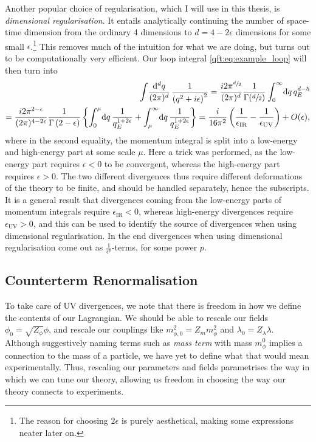 \documentclass[../main.tex]{subfiles}
\begin{document}
Another popular choice of regularisation, which I will use in this thesis, is
\emph{dimensional regularisation}. It entails analytically continuing the
number of space-time dimension from the ordinary 4 dimensions to \(d
= 4-2\epsilon\) dimensions for some small \(\epsilon\).\footnote{The reason for choosing \(2\epsilon\) is purely aesthetical, making some expressions neater later on.} This removes much of
the intuition for what we are doing, but turns out to be computationally very
efficient. Our loop integral \cref{qft:eq:example_loop} will then turn into
\begin{align}
  \nonumber
  \loopintegral[d]{q} \frac{1}{\pclosed{q^2+i\epsilon}^2} = \frac{i
    2\pi^{\sfrac{d}{2}}}{(2\pi)^d} \frac{1}{\Gamma(\sfrac{d}{2})}
  \integral[_0^\infty]{q} q_E^{d-5} \\
  = \frac{i 2\pi^{2-\epsilon}}{(2\pi)^{4-2\epsilon}}
  \frac{1}{\Gamma\pclosed{2-\epsilon}} \cclosed{ \integral[_0^\mu]{q}
  \frac{1}{q_E^{1+2\epsilon}} + \integral[_\mu^\infty]{q}
  \frac{1}{q_E^{1+2\epsilon}} } = \frac{i}{16\pi^2}
  \pclosed{\frac{1}{\epsilon_\text{IR}} - \frac{1}{\epsilon_\text{UV}}} +
  O(\epsilon),
\end{align}
where in the second equality, the momentum integral is split into a low-energy and high-energy part at some scale \(\mu\).
Here a trick was performed, as the low-energy part requires \(\epsilon < 0\) to be convergent, whereas the high-energy part requires \(\epsilon>0\).
The two different divergences thus require different deformations of the theory to be finite, and should be handled separately, hence the subscripts.
It is a general result that divergences coming from the low-energy parts of momentum integrals require \(\epsilon_{\text{IR}} < 0\), whereas high-energy divergences require \(\epsilon_{\text{UV}} > 0\), and this can be used to identify the source of divergences when using dimensional regularisation.
In the end divergences when using dimensional regularisation come out as \(\frac{1}{\epsilon^p}\)-terms, for some power \(p\).






\subsection{Counterterm Renormalisation}
\label{qft:subsec:counterterms}
To take care of UV divergences, we note that there is freedom in how we define the contents of our Lagrangian.
We should be able to rescale our fields \(\phi_0 = \sqrt{Z_\phi} \phi\), and rescale our couplings like \(m_{\phi,0}^2 = Z_m m_\phi^2\) and \(\lambda_0 = Z_\lambda \lambda\).
Although suggestively naming terms such as \emph{mass term} with mass \(m_\phi^0\) implies a connection to the mass of a particle, we have yet to define what that would mean experimentally.
Thus, rescaling our parameters and fields parametrises the way in which we can tune our theory, allowing us freedom in choosing the way our theory connects to experiments.
\end{document}
